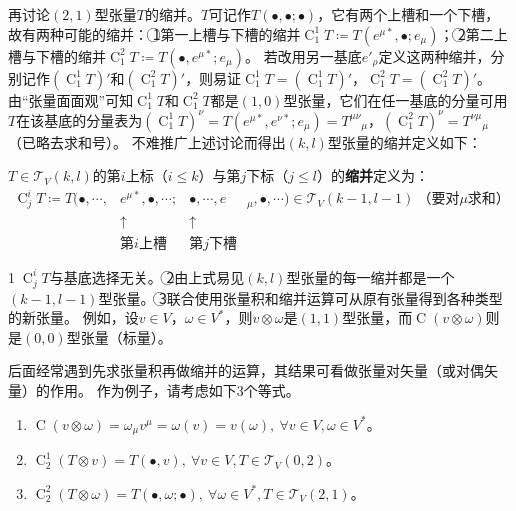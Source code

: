 再讨论$(2, 1)$型张量$T$的缩并。$T$可记作$T(\bullet, \bullet; \bullet)$，它有两个上槽和一个下槽，故有两种可能的缩并：
\textcircled{1}第一上槽与下槽的缩并$\operatorname{C}^1_1T \coloneq T(e^{\mu*}, \bullet; e_\mu)$；
\textcircled{2}第二上槽与下槽的缩并$\operatorname{C}^2_1T \coloneq T(\bullet, e^{\mu*}; e_\mu)$。
若改用另一基底${e'_\rho}$定义这两种缩并，分别记作$(\operatorname{C}^1_1T)'$和$(\operatorname{C}^2_1T)'$，则易证$\operatorname{C}^1_1T = (\operatorname{C}^1_1T)'$，$\operatorname{C}^2_1T = (\operatorname{C}^2_1T)'$。
由``张量面面观''可知$\operatorname{C}^1_1T$和$\operatorname{C}^2_1T$都是$(1, 0)$型张量，它们在任一基底的分量可用$T$在该基底的分量表为$(\operatorname{C}^1_1T)^\nu = T(e^{\mu*}, e^{\nu*}; e_\mu) = T^{\mu\nu}{}_\mu$，$(\operatorname{C}^2_1T)^\nu = T^{\nu\mu}{}_\mu$（已略去求和号）。
不难推广上述讨论而得出$(k, l)$型张量的缩并定义如下：

\begin{definition}
$T \in \mathscr{T}_V(k, l)$的第$i$上标（$i \leq k$）与第$j$下标（$j \leq l$）的\textbf{缩并}定义为：
$$\begin{aligned}
\operatorname{C}^i_jT \coloneq T(\bullet, \cdots, & e^{\mu*}, \bullet, \cdots; & \bullet, \cdots, e&_\mu, \bullet, \cdots) \in \mathscr{T}_V(k - 1, l - 1) ~ \text{（要对$\mu$求和）} \\
& \uparrow & \uparrow & \\
& \text{第$i$上槽} & \text{第$j$下槽} &
\end{aligned}$$
\end{definition}

\begin{note}
\textcircled{1}$\operatorname{C}^i_jT$与基底选择无关。
\textcircled{2}由上式易见$(k, l)$型张量的每一缩并都是一个$(k - 1, l - 1)$型张量。
\textcircled{3}联合使用张量积和缩并运算可从原有张量得到各种类型的新张量。
例如，设$v \in V$，$\omega \in V^*$，则$v \otimes \omega$是$(1, 1)$型张量，而$\operatorname{C}(v \otimes \omega)$则是$(0, 0)$型张量（标量）。
\end{note}

后面经常遇到先求张量积再做缩并的运算，其结果可看做张量对矢量（或对偶矢量）的作用。
作为例子，请考虑如下$3$个等式。

\begin{enumerate}[（a）]
\item $\operatorname{C}(v \otimes \omega) = \omega_\mu v^\mu = \omega(v) = v(\omega), ~ \forall v \in V, \omega \in V^*$。
\item $\operatorname{C}^1_2(T \otimes v) = T(\bullet, v), ~ \forall v \in V, T \in \mathscr{T}_V(0, 2)$。
\item $\operatorname{C}^2_2(T \otimes \omega) = T(\bullet, \omega; \bullet), ~ \forall \omega \in V^*, T \in \mathscr{T}_V(2, 1)$。
\end{enumerate}

